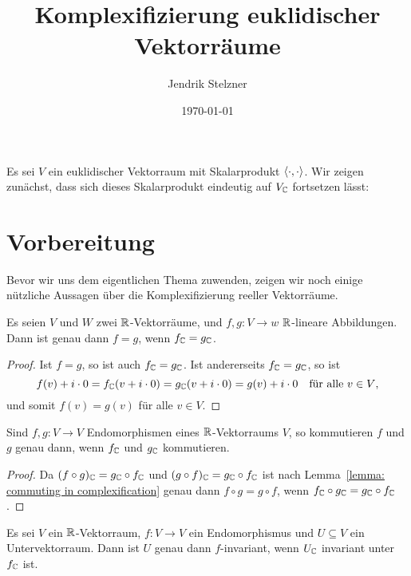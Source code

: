 \documentclass[a4paper,10pt]{article}
\title{Komplexifizierung euklidischer Vektorräume}
\author{Jendrik Stelzner}
\date{\today}
\begin{document}
\maketitle


Es sei $V$ ein euklidischer Vektorraum mit Skalarprodukt $\langle \cdot, \cdot \rangle$.
Wir zeigen zunächst, dass sich dieses Skalarprodukt eindeutig auf $V_{\mathbb{C}}$ fortsetzen lässt:


\section{Vorbereitung}


Bevor wir uns dem eigentlichen Thema zuwenden, zeigen wir noch einige nützliche Aussagen über die Komplexifizierung reeller Vektorräume.


\begin{lemma}\label{lemma: commuting in complexification}
  Es seien $V$ und $W$ zwei $\mathbb{R}$-Vektorräume, und $f, g \colon V \to w$ $\mathbb{R}$-lineare Abbildungen.
  Dann ist genau dann $f = g$, wenn $f_{\mathbb{C}} = g_{\mathbb{C}}$.
\end{lemma}


\begin{proof}
  Ist $f = g$, so ist auch $f_{\mathbb{C}} = g_{\mathbb{C}}$.
  Ist andererseits $f_{\mathbb{C}} = g_{\mathbb{C}}$, so ist
  \[
    f(v) + i \cdot 0
    = f_{\mathbb{C}}(v + i \cdot 0)
    = g_{\mathbb{C}}(v + i \cdot 0)
    = g(v) + i \cdot 0
    \quad
    \text{für alle $v \in V$},
  \]
  und somit $f(v) = g(v)$ für alle $v \in V$.
\end{proof}


\begin{corollary}
  Sind $f, g \colon V \to V$ Endomorphismen eines $\mathbb{R}$-Vektorraums $V$, so kommutieren $f$ und $g$ genau dann, wenn $f_{\mathbb{C}}$ und $g_{\mathbb{C}}$ kommutieren.
\end{corollary}


\begin{proof}
  Da $(f \circ g)_{\mathbb{C}} = g_{\mathbb{C}} \circ f_{\mathbb{C}}$ und $(g \circ f)_{\mathbb{C}} = g_{\mathbb{C}} \circ f_{\mathbb{C}}$ ist nach Lemma~\ref{lemma: commuting in complexification} genau dann $f \circ g = g \circ f$, wenn $f_{\mathbb{C}} \circ g_{\mathbb{C}} = g_{\mathbb{C}} \circ f_{\mathbb{C}}$.
\end{proof}


\begin{lemma}\label{lem: invariance of induced subspaces}
  Es sei $V$ ein $\mathbb{R}$-Vektorraum, $f \colon V \to V$ ein Endomorphismus und $U \subseteq V$ ein Untervektorraum.
  Dann ist $U$ genau dann $f$-invariant, wenn $U_{\mathbb{C}}$ invariant unter $f_{\mathbb{C}}$ ist.
\end{lemma}
\end{document}
